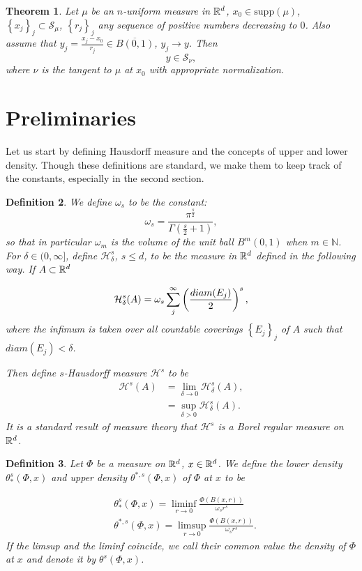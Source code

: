 \documentclass[11pt]{article}
\newtheorem{theorem}{Theorem}[section]
\newtheorem{definition}[theorem]{Definition}
\theoremstyle{definition}
\theoremstyle{remark}
\numberwithin{equation}{section}
\let\inf\relax \DeclareMathOperator*\inf{\vphantom{p}inf}
\newcommand{\NN}{\mathbb{N}}
\begin{document}
 \begin{theorem} \label{theorem3}
 Let $\mu$ be an $n$-uniform measure in $\mathbb{R}^d$, $x_0 \in \mbox{supp}(\mu)$, $\left\lbrace x_j \right\rbrace _{j} \subset \mathcal{S}_{\mu}$, $\left\lbrace r_j \right\rbrace _{j}$ any sequence of positive numbers decreasing to $0$.
Also assume that $y_j=\frac{x_j - x_0}{r_j} \in \overline{B(0,1)}$, $y_j \to y$.
Then $$y \in \mathcal{S}_{\nu},$$
where $\nu$ is the  tangent to $\mu$ at $x_0$ with appropriate normalization.
\end{theorem}

\section{Preliminaries}
Let us start by defining Hausdorff measure and the concepts of upper and lower density. Though these definitions are standard, we make them to keep track of the constants, especially in the second section.

\begin{definition}
We define $\omega_s$ to be the constant:
\begin{equation}\nonumber
\omega_s=\frac{\pi^{\frac{s}{2}}}{\Gamma(\frac{s}{2} +1)},
\end{equation}
so that in particular $\omega_m$ is the  volume of the unit ball $B^{m}(0,1)$ when $m \in \NN$.
For $\delta \in (0,\infty]$, define $\mathcal{H}^{s}_{\delta}$, $s \leq d$, to be the measure in $\mathbb{R}^{d}$ defined in the following way. If $A \subset \mathbb{R}^{d}$

\begin{equation}\nonumber
\mathcal{H}^{s}_{\delta}(A)=\omega_{s} \inf \sum_{j}^{\infty} \left( \frac{diam(E_j)}{2}\right)^{s}, 
\end{equation}
where the infimum is taken over all countable coverings $\left\lbrace E_j \right\rbrace_{j}$ of
 $A$ such that $diam(E_j)<\delta$.

Then define $s$-Hausdorff measure $\mathcal{H}^s$ to be 
\begin{align}
\mathcal{H}^s(A)&=\lim_{\delta \to 0}\mathcal{H}^{s}_{\delta}(A), \nonumber \\
&= \sup_{\delta>0}\mathcal{H}^{s}_{\delta}(A).
\end{align}
It is a standard result of measure theory that $\mathcal{H}^s$ is a Borel regular measure on $\mathbb{R}^{d}$.
\end{definition}

\begin{definition}
Let $\Phi$ be a measure on $\mathbb{R}^{d}$, $x \in \mathbb{R}^{d}$. We define the lower density $\theta_{*}^{s}(\Phi, x)$ and upper density $\theta^{*, s}(\Phi, x)$ of $\Phi$ at $x$ to be 

\begin{align}
& \theta_{*}^{s}(\Phi, x) = \liminf_{r \to 0} \frac{\Phi(B(x,r))}{\omega_s r^{s}} \nonumber\\
& \theta^{*,s}(\Phi, x) = \limsup_{r \to 0} \frac{\Phi(B(x,r))}{\omega_s r^{s}}.
\end{align}
If the limsup and the liminf coincide, we call their common value the density of $\Phi$ at $x$ and denote it by $\theta^{s}(\Phi,x)$.

\end{definition}
\end{document}
